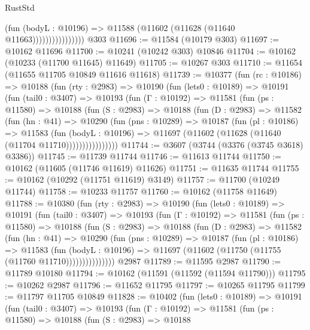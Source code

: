 \begin{lexlean}{RustStd}
\begin{coremodule}
                            (fun (bodyL : @10196) =>
                            @11588 (@11602 (@11628 (@11640 @11663))))))))))))))))
    @303
@11696 := @11584 (@10179 @303)
@11697 := @10162 @11696
@11700 := @10241 (@10242 @303) @10846
@11704 := @10162 (@10233 (@11700 @11645) @11649)
@11705 := @10267 @303
@11710 := @11654 (@11655 @11705 @10849 @11616 @11618)
@11739 := @10377
    (fun (rc : @10186) =>
    @10188
      (fun (rty : @2983) =>
      @10190
        (fun (lets0 : @10189) =>
        @10191
          (fun (tail0 : @3407) =>
          @10193
            (fun (Γ : @10192) =>
            @11581
              (fun (ps : @11580) =>
              @10188
                (fun (S : @2983) =>
                @10188
                  (fun (D : @2983) =>
                  @11582
                    (fun (hn : @41) =>
                    @10290
                      (fun (pns : @10289) =>
                      @10187
                        (fun (pl : @10186) =>
                        @11583
                          (fun (bodyL : @10196) =>
                          @11697 (@11602 (@11628 (@11640 (@11704 @11710))))))))))))))))
@11744 := @3607 (@3744 (@3376 (@3745 @3618) @3386))
@11745 := @11739 @11744
@11746 := @11613 @11744
@11750 := @10162 (@11605 (@11746 @11619) @11626)
@11751 := @11635 @11744
@11755 := @10162 (@10292 (@11751 @11619) @3149)
@11757 := @11700 (@10249 @11744)
@11758 := @10233 @11757
@11760 := @10162 (@11758 @11649)
@11788 := @10380
    (fun (rty : @2983) =>
    @10190
      (fun (lets0 : @10189) =>
      @10191
        (fun (tail0 : @3407) =>
        @10193
          (fun (Γ : @10192) =>
          @11581
            (fun (ps : @11580) =>
            @10188
              (fun (S : @2983) =>
              @10188
                (fun (D : @2983) =>
                @11582
                  (fun (hn : @41) =>
                  @10290
                    (fun (pns : @10289) =>
                    @10187
                      (fun (pl : @10186) =>
                      @11583
                        (fun (bodyL : @10196) =>
                        @11697 (@11602 (@11750 (@11755 (@11760 @11710)))))))))))))))
    @2987
@11789 := @11595 @2987
@11790 := @11789 @10180
@11794 := @10162 (@11591 (@11592 (@11594 @11790)))
@11795 := @10262 @2987
@11796 := @11652 @11795
@11797 := @10265 @11795
@11799 := @11797 @11705 @10849
@11828 := @10402
    (fun (lets0 : @10189) =>
    @10191
      (fun (tail0 : @3407) =>
      @10193
        (fun (Γ : @10192) =>
        @11581
          (fun (ps : @11580) =>
          @10188
            (fun (S : @2983) =>
            @10188

\end{coremodule}
\end{lexlean}
